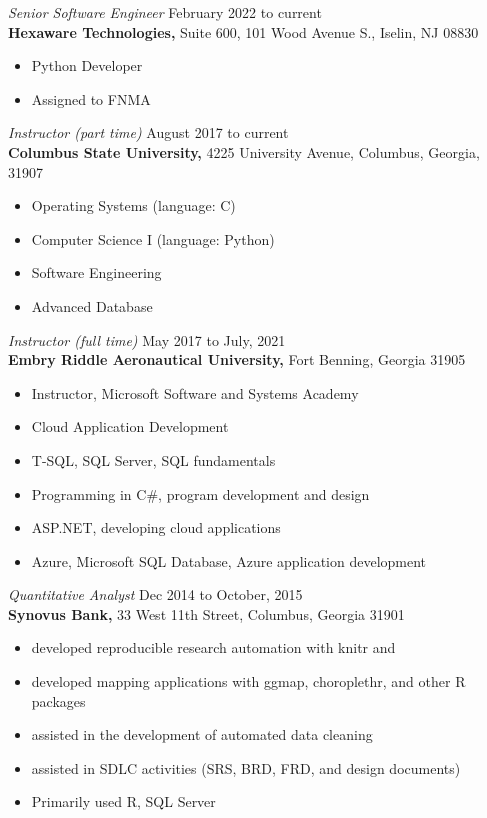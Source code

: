 \documentclass[margin, 10pt]{res} %
\begin{document}
\begin{resume}
 
{\it Senior Software Engineer} \hfill February 2022 to current \\
\textbf{Hexaware Technologies,} \hfill Suite 600, 101 Wood Avenue S., Iselin, NJ 08830
\begin{itemize} \itemsep -2pt %
            \footnotesize
\item Python Developer
\item Assigned to FNMA
\end{itemize}

 
{\it Instructor (part time)} \hfill August 2017 to current \\
\textbf{Columbus State University,} \hfill 4225 University Avenue, Columbus, Georgia, 31907
\begin{itemize} \itemsep -2pt %
            \footnotesize
\item Operating Systems (language: C)
\item Computer Science I (language: Python)
\item Software Engineering
\item Advanced Database
\end{itemize}

{\it Instructor (full time)} \hfill May 2017 to July, 2021 \\
\textbf{Embry Riddle Aeronautical University,} \hfill Fort Benning, Georgia 31905 \\
\begin{itemize} \itemsep -2pt %
            \footnotesize
\item Instructor, Microsoft Software and Systems Academy
\item Cloud Application Development
\item T-SQL, SQL Server, SQL fundamentals
\item Programming in C\#, program development and design
\item ASP.NET, developing cloud applications
\item Azure, Microsoft SQL Database, Azure application development
\end{itemize}

{\it Quantitative Analyst} \hfill Dec 2014 to October, 2015 \\
\textbf{Synovus Bank,} \hfill 33 West 11th Street, Columbus, Georgia 31901
\begin{itemize} \itemsep -2pt %
            \footnotesize
\item developed reproducible research automation with knitr and \LaTeXe
\item developed mapping applications with ggmap, choroplethr, and other \textsf{R} packages
\item assisted in the development of automated data cleaning 
\item assisted in SDLC activities (SRS, BRD, FRD, and design documents)
\item Primarily used \textsf{R}, SQL Server
\end{itemize}
 

\end{resume}
\end{document}
